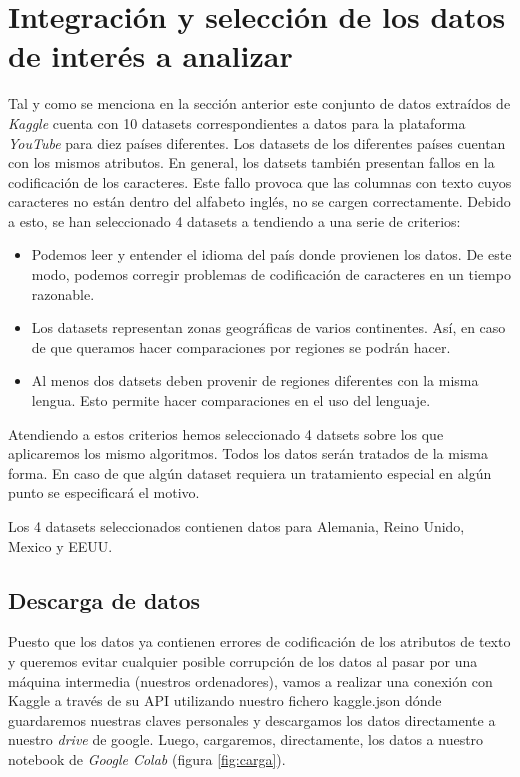 \documentclass[a4paper,12pt]{article}
\begin{document}
\section{Integraci\'on y selecci\'on de los datos de inter\'es a analizar}

Tal y como se menciona en la secci\'on anterior este conjunto de datos extra\'idos de {\itshape Kaggle} cuenta con 10 datasets correspondientes a datos para la plataforma {\itshape YouTube} para diez pa\'ises diferentes. Los datasets de los diferentes pa\'ises cuentan con los mismos atributos. En general, los datsets tambi\'en presentan fallos en la codificaci\'on de los caracteres. Este fallo provoca que las columnas con texto cuyos caracteres no est\'an dentro del alfabeto ingl\'es, no se cargen correctamente. Debido a esto, se han seleccionado 4 datasets a tendiendo a una serie de criterios:

\begin{itemize}

\item Podemos leer y entender el idioma del pa\'is donde provienen los datos. De este modo, podemos corregir problemas de codificaci\'on de caracteres en un tiempo razonable.
\item Los datasets representan zonas geogr\'aficas de varios continentes. As\'i, en caso de que queramos hacer comparaciones por regiones se podr\'an hacer. 
\item Al menos dos datsets deben provenir de regiones diferentes con la misma lengua. Esto permite hacer comparaciones en el uso del lenguaje.



\end{itemize} 

Atendiendo a estos criterios hemos seleccionado 4 datsets sobre  los que aplicaremos los mismo algoritmos. Todos los datos ser\'an tratados de la misma forma. En caso de que alg\'un dataset requiera un tratamiento especial en alg\'un punto se especificar\'a el motivo.

Los 4 datasets seleccionados contienen datos para Alemania, Reino Unido, Mexico y EEUU.

\subsection{Descarga de datos}

Puesto que los datos ya contienen errores de codificaci\'on de los atributos de texto y queremos evitar cualquier posible corrupci\'on de los datos al pasar por una m\'aquina intermedia (nuestros ordenadores), vamos a realizar una conexi\'on con Kaggle a trav\'es de su API utilizando nuestro fichero kaggle.json d\'onde guardaremos nuestras claves personales y descargamos los datos directamente a nuestro {\itshape drive} de google. Luego, cargaremos, directamente, los datos a nuestro notebook de {\itshape Google Colab} (figura \ref{fig:carga}). 
\end{document}
